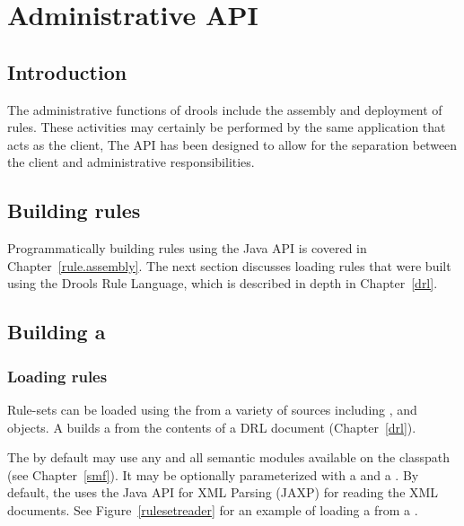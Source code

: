 \chapter{Administrative API}
\label{admin.api}

\section{Introduction}

The administrative functions of drools include the assembly
and deployment of rules.  These activities may certainly be
performed by the same application that acts as the client,
The API has been designed to allow for the separation between
the client and administrative responsibilities.

\section{Building rules}

Programmatically building rules using the Java API is covered
in Chapter~\vref{rule.assembly}.  The next section discusses
loading rules that were built using the Drools Rule Language,
which is described in depth in Chapter~\vref{drl}.

\section{Building a }

\subsection{Loading rules}
\label{admin.rules.loading}

Rule-sets can be loaded using the  from
a variety of sources including ,  and
 objects.  A  builds a
 from the contents of a DRL document (Chapter~\vref{drl}).

The  by default may use any and all semantic
modules available on the classpath (see Chapter~\vref{smf}).  It may
be optionally parameterized with a  and a
.  By default, the
 uses the Java API for XML Parsing (JAXP) 
for reading the XML documents. See Figure~\vref{rulesetreader} for an
example of loading a  from a .

